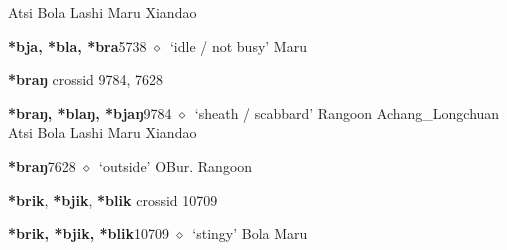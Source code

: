 \begin{list}{}{\leftmargin=1.5em \itemindent=-1.5em}
\hspace{1ex}
         Atsi 
\hspace{1ex}
         Bola 
\hspace{1ex}
         Lashi 
\hspace{1ex}
         Maru 
\hspace{1ex}
         Xiandao 
  \item {\footnotesize \textbf{*bja, *bla, *bra}}{\tiny 5738}
\hspace{1ex}
         $\diamond$~`idle / not busy'
         Maru 
  \end{list}
\item
\textbf{*braŋ}
  {\tiny crossid 9784, 7628}
  \begin{list}{}{\leftmargin=1.5em \itemindent=-1.5em}
  \item {\footnotesize \textbf{*braŋ, *blaŋ, *bjaŋ}}{\tiny 9784}
         $\diamond$~`sheath / scabbard'
         Rangoon 
\hspace{1ex}
         Achang\_Longchuan 
\hspace{1ex}
         Atsi 
\hspace{1ex}
         Bola 
\hspace{1ex}
         Lashi 
\hspace{1ex}
         Maru 
\hspace{1ex}
         Xiandao 
  \item {\footnotesize \textbf{*braŋ}}{\tiny 7628}
\hspace{1ex}
         $\diamond$~`outside'
         OBur. 
\hspace{1ex}
         Rangoon 
  \end{list}
\item
\textbf{*brik}, \textbf{*bjik}, \textbf{*blik}
  {\tiny crossid 10709}
  \begin{list}{}{\leftmargin=1.5em \itemindent=-1.5em}
  \item {\footnotesize \textbf{*brik, *bjik, *blik}}{\tiny 10709}
         $\diamond$~`stingy'
         Bola 
\hspace{1ex}
         Maru 
  \end{list}
